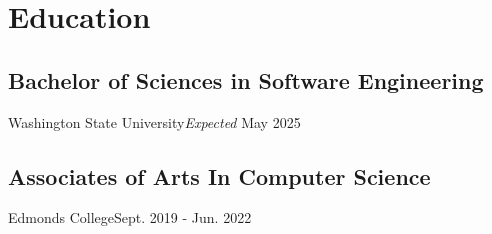 \section{Education}
\subsection{Bachelor of Sciences in Software Engineering}{Washington State University}{\textit{Expected} May 2025} \\
\subsection{Associates of Arts In Computer Science}{Edmonds College}{Sept. 2019 - Jun. 2022} \